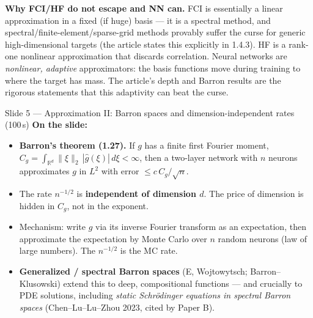 \documentclass[11pt]{article}
\begin{document}
\begin{depth}
\textbf{Why FCI/HF do not escape and NN can.} FCI is essentially a linear approximation in a fixed
(if huge) basis --- it is a spectral method, and spectral/finite-element/sparse-grid methods
provably suffer the curse for generic high-dimensional targets (the article states this explicitly
in 1.4.3). HF is a rank-one nonlinear approximation that discards correlation. Neural networks are
\emph{nonlinear, adaptive} approximators: the basis functions move during training to where the
target has mass. The article's depth and Barron results are the rigorous statements that this
adaptivity can beat the curse.
\end{depth}

\begin{slide}{Slide 5 --- Approximation II: Barron spaces and dimension-independent rates (100\,s)}
\textbf{On the slide:}
\begin{itemize}[leftmargin=*]
\item \textbf{Barron's theorem (1.27).} If $g$ has a finite first Fourier moment,
$C_g=\int_{\mathbb R^d}\|\xi\|_2\,|\hat g(\xi)|\,d\xi<\infty$, then a two-layer network with $n$
neurons approximates $g$ in $L^2$ with error $\le c\,C_g/\sqrt n$.
\item The rate $n^{-1/2}$ is \textbf{independent of dimension $d$}. The price of dimension is hidden
in $C_g$, not in the exponent.
\item Mechanism: write $g$ via its inverse Fourier transform as an expectation, then approximate the
expectation by Monte Carlo over $n$ random neurons (law of large numbers). The $n^{-1/2}$ is the MC
rate.
\item \textbf{Generalized / spectral Barron spaces} (E, Wojtowytsch; Barron--Klusowski) extend this
to deep, compositional functions --- and crucially to PDE solutions, including \emph{static
Schr\"odinger equations in spectral Barron spaces} (Chen--Lu--Lu--Zhou 2023, cited by Paper B).
\end{itemize}
\end{slide}
\end{document}

